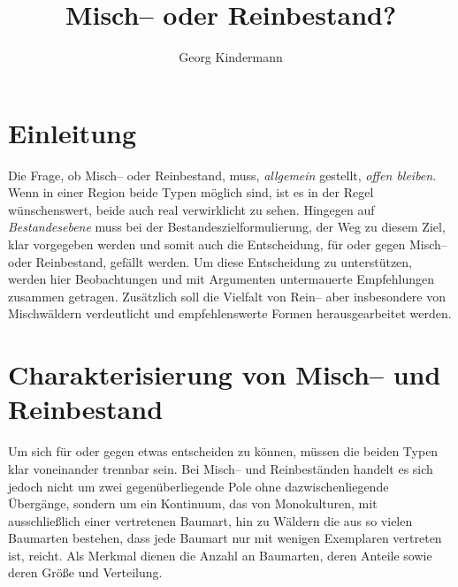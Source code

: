 \documentclass[twocolumn]{scrartcl}
\title{Misch-- oder Reinbestand?}
\author{Georg Kindermann}
\begin{document}

\tableofcontents

\section{Einleitung}

Die Frage, ob Misch-- oder Reinbestand, muss, \emph{allgemein}
gestellt, \emph{offen bleiben}. Wenn in einer Region beide Typen
möglich sind, ist es in der Regel wünschenswert, beide auch real
verwirklicht zu sehen. Hingegen auf \emph{Bestandesebene} muss bei der
Bestandeszielformulierung, der Weg zu diesem Ziel, klar vorgegeben
werden und somit auch die Entscheidung, für oder gegen Misch-- oder
Reinbestand, gefällt werden. Um diese Entscheidung zu unterstützen,
werden hier Beobachtungen und mit Argumenten untermauerte Empfehlungen
zusammen getragen. Zusätzlich soll die Vielfalt von Rein-- aber
insbesondere von Mischwäldern verdeutlicht und empfehlenswerte Formen
herausgearbeitet werden.

\section{Charakterisierung von Misch-- und Reinbestand}
\label{sec:charakterisierung}

Um sich für oder gegen etwas entscheiden zu können, müssen die beiden
Typen klar voneinander trennbar sein. Bei Misch-- und Reinbeständen
handelt es sich jedoch nicht um zwei gegenüberliegende Pole ohne
dazwischenliegende Übergänge, sondern um ein Kontinuum, das von
Monokulturen, mit ausschließlich einer vertretenen Baumart, hin zu
Wäldern die aus so vielen Baumarten bestehen, dass jede Baumart nur
mit wenigen Exemplaren vertreten ist, reicht. Als Merkmal dienen die
Anzahl an Baumarten, deren Anteile sowie deren Größe und Verteilung.
\end{document}
